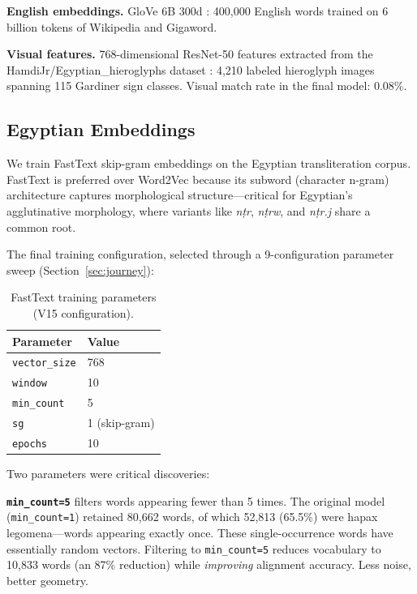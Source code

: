 \documentclass[11pt, a4paper]{article}
\begin{document}
\textbf{English embeddings.} GloVe 6B 300d \citep{pennington2014glove}: 400,000 English words trained on 6 billion tokens of Wikipedia and Gigaword.

\textbf{Visual features.} 768-dimensional ResNet-50 features extracted from the HamdiJr/Egyptian\_hieroglyphs dataset \citep{hamdijr_hieroglyphs}: 4,210 labeled hieroglyph images spanning 115 Gardiner sign classes. Visual match rate in the final model: 0.08\%.

\subsection{Egyptian Embeddings}

We train FastText skip-gram embeddings \citep{bojanowski2017enriching} on the Egyptian transliteration corpus. FastText is preferred over Word2Vec because its subword (character n-gram) architecture captures morphological structure---critical for Egyptian's agglutinative morphology, where variants like \textit{n\d{t}r}, \textit{n\d{t}rw}, and \textit{n\d{t}r.j} share a common root.

The final training configuration, selected through a 9-configuration parameter sweep (Section~\ref{sec:journey}):

\begin{table}[H]
\centering
\begin{tabular}{ll}
\toprule
Parameter & Value \\
\midrule
\texttt{vector\_size} & 768 \\
\texttt{window} & 10 \\
\texttt{min\_count} & 5 \\
\texttt{sg} & 1 (skip-gram) \\
\texttt{epochs} & 10 \\
\bottomrule
\end{tabular}
\caption{FastText training parameters (V15 configuration).}
\label{tab:fasttext_params}
\end{table}

Two parameters were critical discoveries:

\textbf{\texttt{min\_count=5}} filters words appearing fewer than 5 times. The original model (\texttt{min\_count=1}) retained 80,662 words, of which 52,813 (65.5\%) were hapax legomena---words appearing exactly once. These single-occurrence words have essentially random vectors. Filtering to \texttt{min\_count=5} reduces vocabulary to 10,833 words (an 87\% reduction) while \textit{improving} alignment accuracy. Less noise, better geometry.
\end{document}
